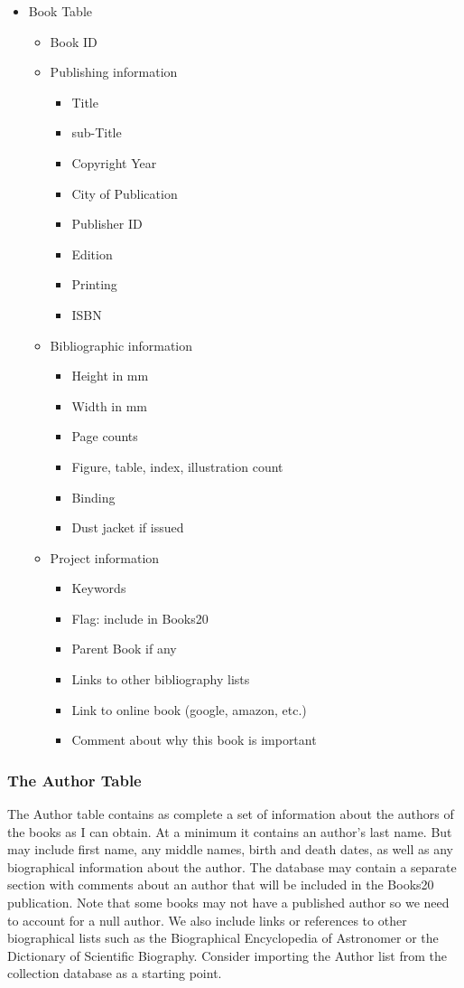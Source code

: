 \documentclass{article}
\begin{document}
\begin{itemize}
\item Book Table
\begin{itemize}
 \item Book ID
 \item Publishing information
 \begin{itemize}
  \item Title
  \item sub-Title
  \item Copyright Year
  \item City of Publication
  \item Publisher ID
  \item Edition
  \item Printing
  \item ISBN
 \end{itemize}
 \item Bibliographic information
 \begin{itemize}
  \item Height in mm
  \item Width in mm
  \item Page counts
  \item Figure, table, index, illustration count
  \item Binding
  \item Dust jacket if issued
 \end{itemize}
 \item Project information
 \begin{itemize}
  \item Keywords
  \item Flag: include in Books20
  \item Parent Book if any
  \item Links to other bibliography lists
  \item Link to online book (google, amazon, etc.)
  \item Comment about why this book is important
 \end{itemize}
\end{itemize}
\end{itemize}


\subsubsection{The Author Table}

The Author table contains as complete a set of information about the
authors of the books as I can obtain.  At a minimum it contains an
author's last name. But may include first name, any middle names,
birth and death dates, as well as any biographical information about
the author. The database may contain a separate section with comments
about an author that will be included in the Books20 publication. Note
that some books may not have a published author so we need to account
for a null author. We also include links or references to other
biographical lists such as the Biographical Encyclopedia of Astronomer
or the Dictionary of Scientific Biography.  Consider importing the
Author list from the collection database as a starting point.
\end{document}
